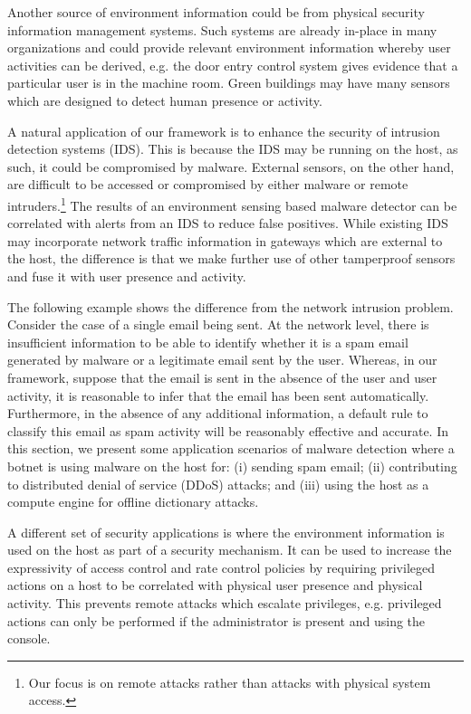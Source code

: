 Another source of environment information could be from physical
security information management systems.
Such systems are already in-place in many organizations and could provide
relevant environment information whereby user activities can be
derived, e.g. the door entry control system gives
evidence that a particular user is in the machine room.
Green buildings may have many sensors which are designed to detect human
presence or activity.

A natural application of our framework is to enhance the security of
intrusion detection systems (IDS).
This is because the IDS may be running on the host, 
as such, it could be compromised by malware.
External sensors, on the other hand, are
difficult to be accessed or compromised by either malware or remote intruders.\footnote{
Our focus is on remote attacks rather than attacks with physical system access.
} 
The results of an environment sensing based malware detector 
can be correlated with alerts from an IDS to reduce false positives.
While existing IDS may incorporate network traffic information in
gateways which are external to the host, the difference is that we
make further use of other tamperproof sensors and fuse it with user
presence and activity. 

The following example shows the difference
from the network intrusion problem. Consider the case of a single
email being sent. At the network level, there is insufficient
information to be able to identify whether it is a spam email
generated by malware or a legitimate email sent by the user. 
Whereas, in our framework, suppose that the
email is sent in the absence of the user and user activity, it is
reasonable to infer that the email has been sent automatically.
Furthermore, in the absence of any additional information, 
a default rule to classify this email as spam activity will be reasonably
effective and accurate.
In this section,
we present some application scenarios of malware detection where a botnet
is using malware on the host for:
(i) sending spam email;
(ii) contributing to distributed denial of service (DDoS) attacks; 
and (iii) using the host as a compute engine for offline
dictionary attacks.

A different set of security applications is where the
environment information is used on the host as part of a security mechanism.
It can be used to increase the expressivity of
access control and rate control policies
by requiring privileged actions on a host to be correlated with
physical user presence and physical activity.
This prevents remote attacks which
escalate privileges, e.g.
privileged actions can only
be performed if the administrator is present
and using the console.

